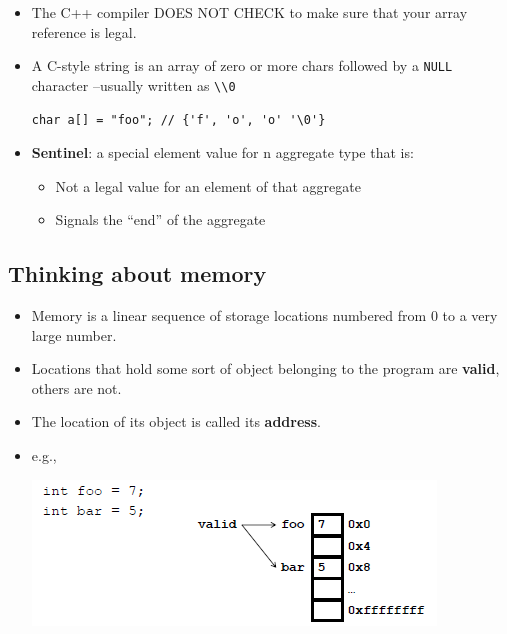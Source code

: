 \begin{itemize}
	\item The C++ compiler DOES NOT CHECK to make sure that your array reference is legal.
	\item A C-style string is an array of zero or more chars followed by a \lstinline[style=C++]{NULL} character –usually written as \lstinline[style=C++]{\\0}
\begin{lstlisting}[style=C++]
	char a[] = "foo"; // {'f', 'o', 'o' '\0'}
\end{lstlisting}

	\item \textbf{Sentinel}: a special element value for n aggregate type that is:
	\begin{itemize}
		\item Not a legal value for an element of that aggregate 
		\item Signals the ``end'' of the aggregate
	\end{itemize}
\end{itemize}

\subsection{Thinking about memory}
\begin{itemize}
	\item Memory is a linear sequence of storage locations numbered from 0 to a very large number.
	\item Locations that hold some sort of object belonging to the program are \textbf{valid}, others are not.
	\item The location of its object is called its \textbf{address}.
	\item e.g.,
	\begin{center}
		\includegraphics[scale=0.85]{sections/lec6/mem.png}
	\end{center}
\end{itemize}

